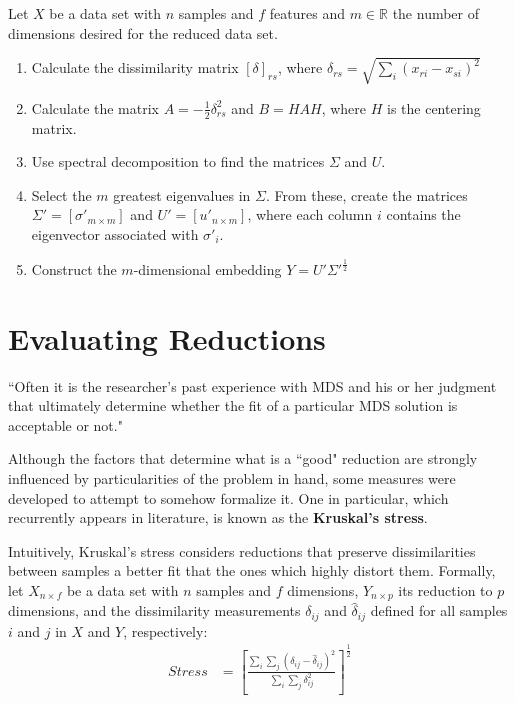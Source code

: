 \documentclass[12pt]{report}
\begin{document}
Let $X$ be a data set with $n$ samples and $f$ features and $m\in\mathbb{R}$ the number of dimensions desired for the reduced data set. \cite{cox2001}

\begin{enumerate}
	\item Calculate the dissimilarity matrix $[\delta]_{rs}$, where $\delta_{rs} = \sqrt{\sum_i (x_{ri} - x_{si})^2}$
	\item Calculate the matrix $A=-\frac{1}{2}\delta_{rs}^2$ and $B=HAH$, where $H$ is the centering matrix.

	\item Use spectral decomposition to find the matrices $\Sigma$ and $U$.

	\item Select the $m$ greatest eigenvalues in $\Sigma$. From these, create the matrices $\Sigma'=[\sigma'_{m\times m}]$ and $U'=[u'_{n\times m}]$, where each column $i$ contains the eigenvector associated with $\sigma'_i$.

	\item Construct the $m$-dimensional embedding $Y=U'\Sigma'^{\frac{1}{2}}$
\end{enumerate}

\section{Evaluating Reductions}

``Often it is the researcher's past experience with MDS and his or her judgment that
ultimately determine whether the fit of a particular MDS solution is acceptable or not." \cite{naes1996multivariate}

Although the factors that determine what is a ``good" reduction are strongly influenced by particularities of the problem in hand, some measures were developed to attempt to somehow formalize it. One in particular, which recurrently appears in literature, is known as the \textbf{Kruskal's stress}.

Intuitively, Kruskal's stress \cite{naes1996multivariate} considers reductions that preserve dissimilarities between samples a better fit that the ones which highly distort them. Formally, let $X_{n \times f}$ be a data set with $n$ samples and $f$ dimensions, $Y_{n \times p}$ its reduction to $p$ dimensions, and the dissimilarity measurements $\delta_{ij}$ and $\hat{\delta}_{ij}$ defined for all samples $i$ and $j$ in $X$ and $Y$, respectively:
\begin{align*}
	Stress &= [\frac{\sum_i \sum_j (\delta_{ij} - \hat{\delta}_{ij})^2}{\sum_i \sum_j \delta_{ij}^2}]^{\frac{1}{2}}
\end{align*}
\end{document}
